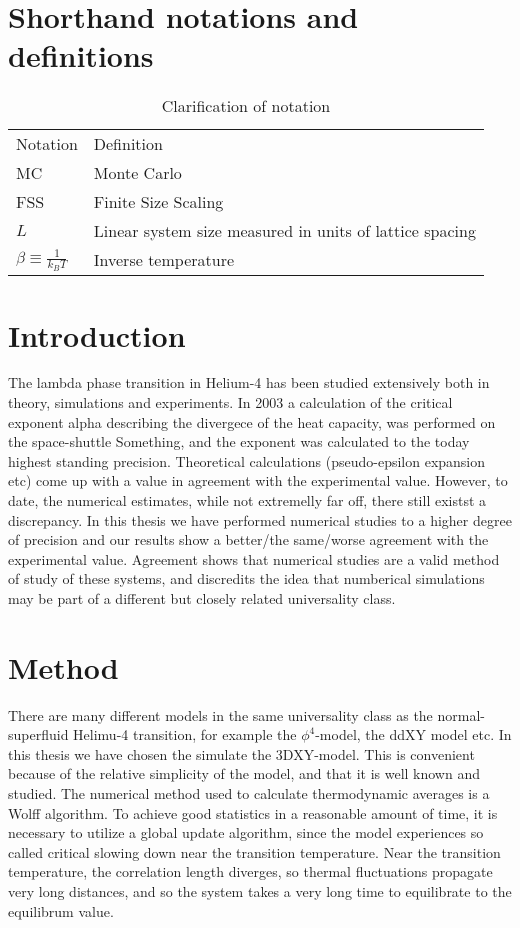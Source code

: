 \documentclass[a4paper]{article}
\begin{document}
\section{Shorthand notations and definitions}
\begin{table}[htpb]
  \begin{center}
    \begin{tabular}{l l}
      Notation & Definition\\
      MC & Monte Carlo\\
      FSS & Finite Size Scaling\\
      $L$ & Linear system size measured in units of lattice spacing\\
      $\beta \equiv \frac{1}{k_B T}$ & Inverse temperature\\
    \end{tabular}
  \end{center}
  \caption{Clarification of notation}
\end{table}
\section{Introduction}
The lambda phase transition in Helium-4 has been studied extensively both in theory, simulations and experiments. In 2003 a calculation of the critical exponent alpha describing the divergece of the heat capacity, was performed on the space-shuttle Something, and the exponent was calculated to the today highest standing precision. Theoretical calculations (pseudo-epsilon expansion etc) come up with a value in agreement with the experimental value. However, to date, the numerical estimates, while not extremelly far off, there still existst a discrepancy. In this thesis we have performed numerical studies to a higher degree of precision and our results show a better/the same/worse agreement with the experimental value. Agreement shows that numerical studies are a valid method of study of these systems, and discredits the idea that numberical simulations may be part of a different but closely related universality class.
\section{Method}
There are many different models in the same universality class as the normal-superfluid Helimu-4 transition, for example the $\phi^4$-model, the ddXY model etc.
In this thesis we have chosen the simulate the 3DXY-model. This is convenient because of the relative simplicity of the model, and that it is well known and studied.
The numerical method used to calculate thermodynamic averages is a Wolff algorithm.
To achieve good statistics in a reasonable amount of time, it is necessary to utilize a global update algorithm, since the model experiences so called critical slowing down near the transition temperature. 
Near the transition temperature, the correlation length diverges, so thermal fluctuations propagate very long distances, and so the system takes a very long time to equilibrate to the equilibrum value.
\end{document}
